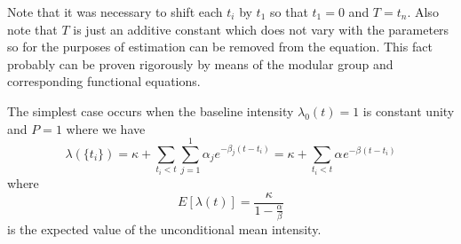 \documentclass{amsart}
\begin{document}
Note that it was necessary to shift each $t_i$ by $t_1$ so that $t_1 = 0$ and
$T = t_n$. Also note that $T$ is just an additive constant which does not vary
with the parameters so for the purposes of estimation can be removed from the
equation. This fact probably can be proven rigorously by means of the modular
group and corresponding functional equations.



The simplest case occurs when the baseline intensity $\lambda_0 ( t) = 1$ is
constant unity and $P = 1$ where we have
\begin{equation}
  \lambda ( \{ t_i \}) = \kappa + \sum_{t_i < t} \sum_{j = 1}^1 \alpha_j e^{-
  \beta_j  ( t - t_i)} = \kappa + \sum_{t_i < t} \alpha_{} e^{- \beta_{}  ( t
  - t_i)} \label{Hawkes1}
\end{equation}
where
\begin{equation}
  E [ \lambda ( t)] = \frac{\kappa}{1 - \frac{\alpha}{\beta}}
\end{equation}
is the expected value of the unconditional mean intensity.
\end{document}
